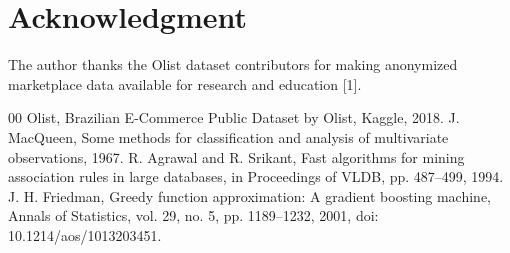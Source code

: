 \documentclass[conference]{IEEEtran}
\begin{document}
\section*{Acknowledgment}
The author thanks the Olist dataset contributors for making anonymized marketplace data available for research and education [1].
\balance
\begin{thebibliography}{00}
 Olist, Brazilian E-Commerce Public Dataset by Olist, Kaggle, 2018.
 J. MacQueen, Some methods for classification and analysis of multivariate observations, 1967.
 R. Agrawal and R. Srikant, Fast algorithms for mining association rules in large databases, in Proceedings of VLDB, pp. 487--499, 1994.
 J. H. Friedman, Greedy function approximation: A gradient boosting machine, Annals of Statistics, vol. 29, no. 5, pp. 1189--1232, 2001, doi: 10.1214/aos/1013203451.
\end{thebibliography}
\end{document}
